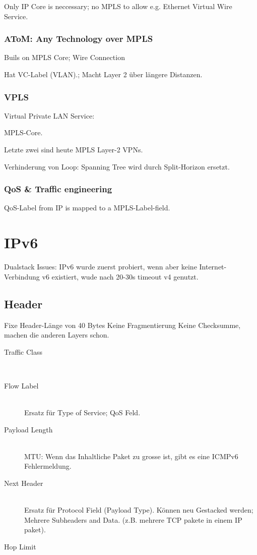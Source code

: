Only IP Core is neccessary; no MPLS to allow e.g. Ethernet Virtual Wire Service.

\subsubsection{AToM: Any Technology over MPLS}

Buils on MPLS Core; Wire Connection

Hat VC-Label (VLAN).; Macht Layer 2 über längere Distanzen.

\subsubsection{VPLS}

Virtual Private LAN Service:

MPLS-Core.

Letzte zwei sind heute MPLS Layer-2 VPNs.

Verhinderung von Loop: Spanning Tree wird durch Split-Horizon ersetzt.


\subsubsection{QoS \& Traffic engineering}

QoS-Label from IP is mapped to a MPLS-Label-field.


\section{IPv6}

Dualstack Issues: IPv6 wurde zuerst probiert, wenn aber keine Internet-Verbindung v6 existiert, wude nach 20-30s timeout v4 genutzt.

\subsection{Header}
Fixe Header-Länge von 40 Bytes
Keine Fragmentierung
Keine Checksumme, machen die anderen Layers schon.

\begin{description}
\item[Traffic Class] \hfill \\
	
\item[Flow Label] \hfill \\
	Ersatz für Type of Service; QoS Feld.
	
\item[Payload Length] \hfill \\

MTU: Wenn das Inhaltliche Paket zu grosse ist, gibt es eine ICMPv6 Fehlermeldung.
	
\item[Next Header] \hfill \\
	Ersatz für Protocol Field (Payload Type).
	Können neu Gestacked werden; Mehrere Subheaders and Data. (z.B. mehrere TCP pakete in einem IP paket).
	
	
	
\item[Hop Limit] \hfill \\
\end{description}

